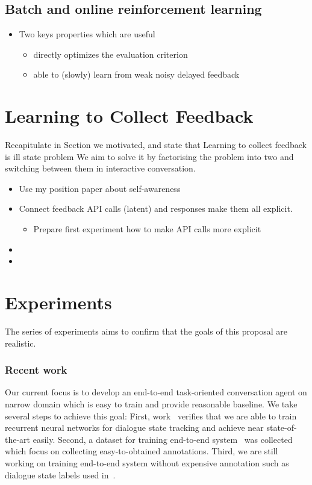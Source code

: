 \documentclass[11pt]{article}
\begin{document}
\subsection{Batch and online reinforcement learning}
\label{sub:rl}
\begin{itemize}
    \item Two keys properties which are useful
        \begin{itemize}
            \item directly optimizes the evaluation criterion
            \item able to (slowly) learn from weak noisy delayed feedback
        \end{itemize}
\end{itemize}


\section{Learning to Collect Feedback}
\label{sec:learn_feedback}
Recapitulate in Section we motivated, and state that Learning to collect feedback is ill state problem
We aim to solve it by factorising the problem into two and switching between them in interactive conversation.

\begin{itemize}
    \item Use my position paper about self-awareness
    \item Connect feedback API calls (latent) and responses make them all explicit.
        \begin{itemize}
            \item Prepare first experiment how to make API calls more explicit
        \end{itemize}
    \item 
    \item 
\end{itemize}

\section{Experiments}
\label{sec:experiments}
The series of experiments aims to confirm that the goals of this proposal are realistic.

\subsubsection*{Recent work}
Our current focus is to develop an end-to-end task-oriented conversation agent on narrow domain which is easy to train and provide reasonable baseline.
We take several steps to achieve this goal:
First, work~\citep{platek2016rnndst} verifies that we are able to train recurrent neural networks for dialogue state tracking and achieve near state-of-the-art easily. 
Second, a dataset for training end-to-end system~\citep{platek2016datae2end} was collected which focus on collecting easy-to-obtained annotations.
Third, we are still working on training end-to-end system without expensive annotation such as dialogue state labels used in~\cite{wen}.
\end{document}
